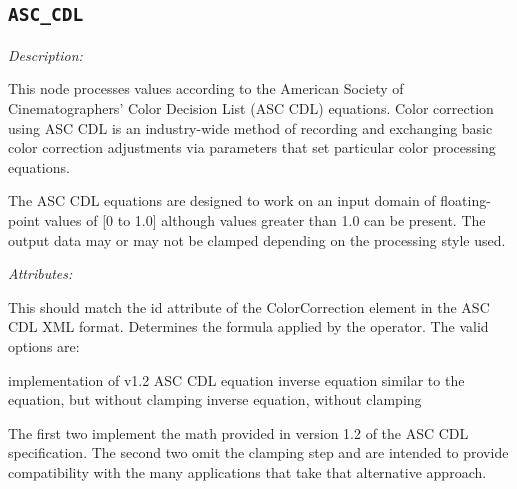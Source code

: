 \subsection{\texttt{ASC\_CDL}}

\emph{Description:} \par
This node processes values according to the American Society of Cinematographers' Color Decision List (ASC CDL) equations. Color correction using ASC CDL is an industry-wide method of recording and exchanging basic color correction adjustments via parameters that set particular color processing equations.

The ASC CDL equations are designed to work on an input domain of floating-point values of [0 to 1.0] although values greater than 1.0 can be present. The output data may or may not be clamped depending on the processing style used.


\emph{Attributes:}
\begin{xmlfields}
    \xmlitem[id][optional] This should match the id attribute of the ColorCorrection element in the ASC CDL XML format.
    \xmlitem[style][required] Determines the formula applied by the operator. The valid options are:
        \begin{xmlfields}
            \xmlitemd["Fwd"] implementation of v1.2 ASC CDL equation
            \xmlitemd["Rev"] inverse equation
            \xmlitemd["FwdNoClamp"] similar to the  equation, but without clamping
            \xmlitemd["RevNoClamp"] inverse equation, without clamping
        \end{xmlfields}
        The first two implement the math provided in version 1.2 of the ASC CDL specification.  The second two omit the clamping step and are intended to provide compatibility with the many applications that take that alternative approach.
\end{xmlfields}

